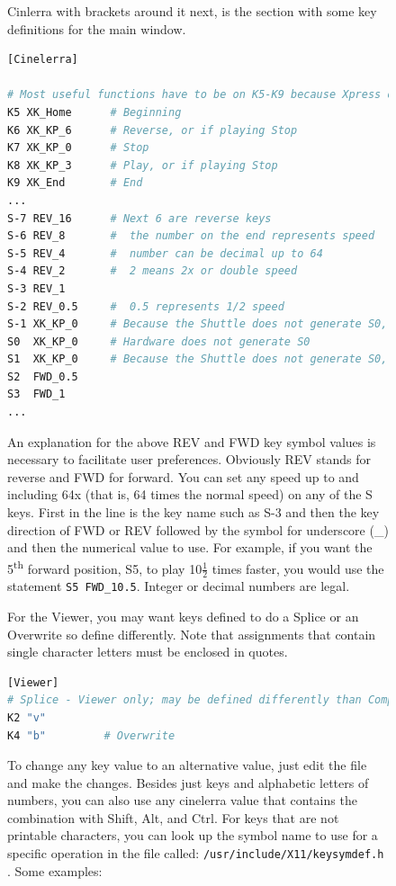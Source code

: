 \begin{figure}
\noindent Cinlerra with brackets around it next, is the section with some key definitions for the main window.

\begin{lstlisting}[language=Bash]
[Cinelerra] 

# Most useful functions have to be on K5-K9 because Xpress only has 5 keys 
K5 XK_Home      # Beginning 
K6 XK_KP_6      # Reverse, or if playing Stop 
K7 XK_KP_0      # Stop 
K8 XK_KP_3      # Play, or if playing Stop 
K9 XK_End       # End 
... 
S-7 REV_16     	# Next 6 are reverse keys 
S-6 REV_8      	#  the number on the end represents speed
S-5 REV_4      	#  number can be decimal up to 64 
S-4 REV_2      	#  2 means 2x or double speed 
S-3 REV_1 
S-2 REV_0.5    	#  0.5 represents 1/2 speed 
S-1 XK_KP_0    	# Because the Shuttle does not generate S0, have to use S-1 
S0  XK_KP_0   	# Hardware does not generate S0 
S1  XK_KP_0   	# Because the Shuttle does not generate S0, have to use S1 
S2  FWD_0.5 
S3  FWD_1 
... 
\end{lstlisting}

\noindent An explanation for the above REV and FWD key symbol values is necessary to facilitate user preferences.  Obviously REV stands for reverse and FWD for forward.  You can set any speed up to and including 64x (that is, 64 times the normal speed) on any of the S keys.  First in the line is the key name such as S-3 and then the key direction of FWD or REV followed by the symbol for underscore (\_) and then the numerical value to use.  For example, if you want the 5\textsuperscript{th} forward position, S5, to play 10$ \frac{1}{2}$ times faster, you would use the statement \texttt{S5 FWD\_10.5}.  Integer or decimal numbers are legal.

For the Viewer, you may want keys defined to do a Splice or an Overwrite so define differently.  Note that assignments that contain single character letters must be enclosed in quotes.

\begin{lstlisting}[language=Bash]
[Viewer] 
# Splice - Viewer only; may be defined differently than Composer or Cinelerra 
K2 "v"         
K4 "b"         # Overwrite
\end{lstlisting}

\noindent To change any key value to an alternative value, just edit the file and make the changes.  Besides just keys and alphabetic letters of numbers, you can also use any cinelerra value that contains the combination with Shift, Alt, and Ctrl.  For keys that are not printable characters, you can look up the symbol name to use for a specific operation in the file called: \texttt{/usr/include/X11/keysymdef.h} .
\noindent Some examples:


\end{figure}
